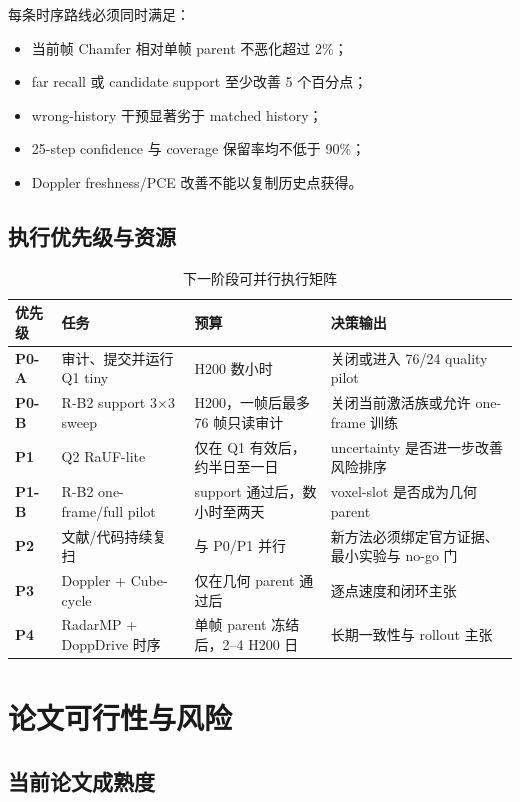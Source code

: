 \documentclass[11pt,a4paper,fontset=none]{ctexart}
\begin{document}
每条时序路线必须同时满足：
\begin{itemize}
  \item 当前帧 Chamfer 相对单帧 parent 不恶化超过 2\%；
  \item far recall 或 candidate support 至少改善 5 个百分点；
  \item wrong-history 干预显著劣于 matched history；
  \item 25-step confidence 与 coverage 保留率均不低于 90\%；
  \item Doppler freshness/PCE 改善不能以复制历史点获得。
\end{itemize}

\subsection{执行优先级与资源}

\begin{table}[H]
\centering
\small
\caption{下一阶段可并行执行矩阵}
\begin{tabularx}{\textwidth}{>{\bfseries}p{1.5cm} p{4.0cm} p{2.5cm} Y}
\toprule
优先级 & 任务 & 预算 & 决策输出 \\
\midrule
P0-A & 审计、提交并运行 Q1 tiny & H200 数小时 & 关闭或进入 76/24 quality pilot \\
P0-B & R-B2 support 3$\times$3 sweep & H200，一帧后最多 76 帧只读审计 & 关闭当前激活族或允许 one-frame 训练 \\
P1 & Q2 RaUF-lite & 仅在 Q1 有效后，约半日至一日 & uncertainty 是否进一步改善风险排序 \\
P1-B & R-B2 one-frame/full pilot & support 通过后，数小时至两天 & voxel-slot 是否成为几何 parent \\
P2 & 文献/代码持续复扫 & 与 P0/P1 并行 & 新方法必须绑定官方证据、最小实验与 no-go 门 \\
P3 & Doppler + Cube-cycle & 仅在几何 parent 通过后 & 逐点速度和闭环主张 \\
P4 & RadarMP + DoppDrive 时序 & 单帧 parent 冻结后，2--4 H200 日 & 长期一致性与 rollout 主张 \\
\bottomrule
\end{tabularx}
\end{table}

\section{论文可行性与风险}

\subsection{当前论文成熟度}
\end{document}
